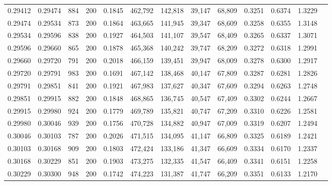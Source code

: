 \begin{tabular}{rrrrrrrrrrrrr}
0.29412 & 0.29474 &    884 & 200 &                                     0.1845 & 462,792 & 142,818 &  39,147 &  68,809 & 0.3251 & 0.6374 & 1.3229 \\
0.29474 & 0.29534 &    873 & 200 &                                     0.1864 & 463,665 & 141,945 &  39,347 &  68,609 & 0.3258 & 0.6355 & 1.3148 \\
0.29534 & 0.29596 &    838 & 200 &                                     0.1927 & 464,503 & 141,107 &  39,547 &  68,409 & 0.3265 & 0.6337 & 1.3071 \\
0.29596 & 0.29660 &    865 & 200 &                                     0.1878 & 465,368 & 140,242 &  39,747 &  68,209 & 0.3272 & 0.6318 & 1.2991 \\
0.29660 & 0.29720 &    791 & 200 &                                     0.2018 & 466,159 & 139,451 &  39,947 &  68,009 & 0.3278 & 0.6300 & 1.2917 \\
0.29720 & 0.29791 &    983 & 200 &                                     0.1691 & 467,142 & 138,468 &  40,147 &  67,809 & 0.3287 & 0.6281 & 1.2826 \\
0.29791 & 0.29851 &    841 & 200 &                                     0.1921 & 467,983 & 137,627 &  40,347 &  67,609 & 0.3294 & 0.6263 & 1.2748 \\
0.29851 & 0.29915 &    882 & 200 &                                     0.1848 & 468,865 & 136,745 &  40,547 &  67,409 & 0.3302 & 0.6244 & 1.2667 \\
0.29915 & 0.29980 &    924 & 200 &                                     0.1779 & 469,789 & 135,821 &  40,747 &  67,209 & 0.3310 & 0.6226 & 1.2581 \\
0.29980 & 0.30046 &    939 & 200 &                                     0.1756 & 470,728 & 134,882 &  40,947 &  67,009 & 0.3319 & 0.6207 & 1.2494 \\
0.30046 & 0.30103 &    787 & 200 &                                     0.2026 & 471,515 & 134,095 &  41,147 &  66,809 & 0.3325 & 0.6189 & 1.2421 \\
0.30103 & 0.30168 &    909 & 200 &                                     0.1803 & 472,424 & 133,186 &  41,347 &  66,609 & 0.3334 & 0.6170 & 1.2337 \\
0.30168 & 0.30229 &    851 & 200 &                                     0.1903 & 473,275 & 132,335 &  41,547 &  66,409 & 0.3341 & 0.6151 & 1.2258 \\
0.30229 & 0.30300 &    948 & 200 &                                     0.1742 & 474,223 & 131,387 &  41,747 &  66,209 & 0.3351 & 0.6133 & 1.2170 \\

\end{tabular}
